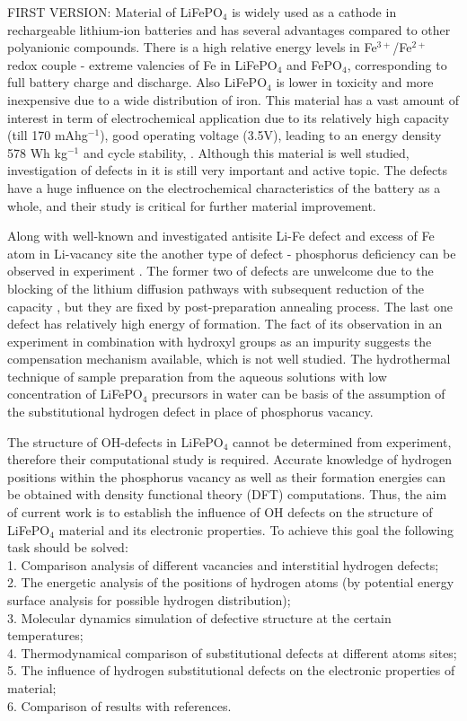 FIRST VERSION:
Material of LiFePO$_4$ is widely used as a cathode in rechargeable lithium-ion batteries and has several advantages compared to other polyanionic compounds. There is a high relative energy levels in Fe$^{3+}$/Fe$^{2+}$ redox couple - extreme valencies of Fe in LiFePO$_4$ and FePO$_4$, corresponding to full battery charge and discharge. Also LiFePO$_4$ is lower in toxicity and more inexpensive due to a wide distribution of iron. This material has a vast amount of interest in term of electrochemical application due to its relatively high capacity (till 170 mAhg$^{-1}$), good operating voltage (3.5V), leading to an energy density 578 Wh kg$^{-1}$ and cycle stability, \cite{franger2003comparison}. Although this material is well studied, investigation of defects in it is still very important and active topic. The defects have a huge influence on the electrochemical characteristics of the battery as a whole, and their study is critical for further material improvement.  

Along with well-known and investigated antisite Li-Fe defect and excess of Fe atom in Li-vacancy site the another type of defect - phosphorus deficiency can be observed in experiment \cite{amisse2015singular}. The former two of defects are unwelcome due to the blocking of the lithium diffusion pathways with subsequent reduction of the capacity \cite{hu2015molecular}, but they are fixed by post-preparation annealing process. The last one defect has relatively high energy of formation. The fact of its observation in an experiment in combination with hydroxyl groups as an impurity \cite{sumanov2019hydrotriphylites} suggests the compensation mechanism available, which is not well studied. The hydrothermal technique of sample preparation from the aqueous solutions with low concentration of LiFePO$_4$ precursors in water can be basis of the assumption of the substitutional hydrogen defect in place of phosphorus vacancy.  

The structure of OH-defects in LiFePO$_4$ cannot be determined from experiment, therefore their computational study is required. Accurate knowledge of hydrogen positions within the phosphorus vacancy as well as their formation energies can be obtained with density functional theory (DFT) computations. Thus, the aim of current work is to establish the influence of OH defects on the structure of LiFePO$_4$ material and its electronic properties. To achieve this goal the following task should be solved:\\
1. Comparison analysis of different vacancies and  interstitial hydrogen defects;\\
2. The energetic analysis of the positions of hydrogen atoms (by potential energy surface analysis for possible hydrogen distribution);\\
3. Molecular dynamics simulation of defective structure at the certain temperatures;\\
4. Thermodynamical comparison of substitutional defects at different atoms sites;\\
5. The influence of hydrogen substitutional defects on the electronic properties of material; \\
6. Comparison of results with references.



